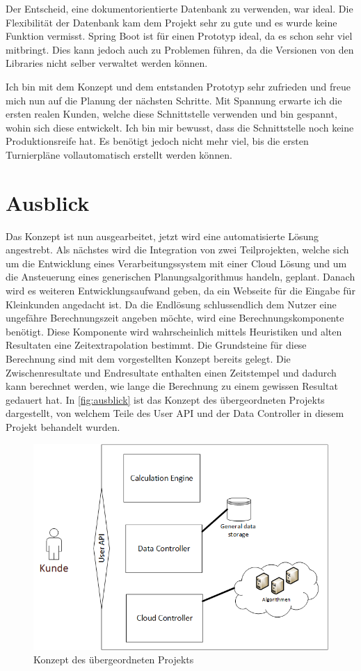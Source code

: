 Der Entscheid, eine dokumentorientierte Datenbank zu verwenden, war ideal. Die Flexibilität der Datenbank kam dem Projekt sehr zu gute und es wurde keine Funktion vermisst. Spring Boot ist für 
einen Prototyp ideal, da es schon sehr viel mitbringt. Dies kann jedoch auch zu Problemen führen, da die Versionen von den Libraries nicht selber verwaltet werden können. 

Ich bin mit dem Konzept und dem entstanden Prototyp sehr zufrieden und freue mich nun auf die Planung der nächsten Schritte. Mit Spannung erwarte ich die ersten realen Kunden, welche diese 
Schnittstelle verwenden und bin gespannt, wohin sich diese entwickelt. Ich bin mir bewusst, dass die Schnittstelle noch keine Produktionsreife hat. Es benötigt jedoch nicht mehr viel, bis die ersten 
Turnierpläne vollautomatisch erstellt werden können.

\section{Ausblick}\label{fazit_ausblick}

Das Konzept ist nun ausgearbeitet, jetzt wird eine automatisierte Lösung angestrebt. Als nächstes wird die Integration von zwei Teilprojekten, welche sich um die Entwicklung eines 
Verarbeitungssystem mit einer Cloud Lösung und um die Ansteuerung eines generischen Planungsalgorithmus handeln, geplant. Danach wird es weiteren Entwicklungsaufwand geben, da ein 
Webseite für die Eingabe für Kleinkunden angedacht ist. Da die Endlösung schlussendlich dem Nutzer eine ungefähre Berechnungszeit angeben möchte, wird eine Berechnungskomponente 
benötigt. Diese Komponente wird wahrscheinlich mittels Heuristiken und alten Resultaten eine Zeitextrapolation bestimmt. Die Grundsteine für diese Berechnung sind mit dem vorgestellten Konzept 
bereits gelegt. Die Zwischenresultate und Endresultate enthalten einen Zeitstempel und dadurch kann berechnet werden, wie lange die Berechnung zu einem gewissen Resultat gedauert hat. In 
\autoref{fig:ausblick} ist das Konzept des übergeordneten Projekts dargestellt, von welchem Teile des User API und der Data Controller in diesem Projekt behandelt wurden.

\begin{figure}[h]
\centering
\includegraphics[scale=0.8]{images/visio/ausblick.png}
\caption[Konzept des übergeordneten Projekts]{Konzept des übergeordneten Projekts \selfmade{}}
\label{fig:ausblick}
\end{figure}